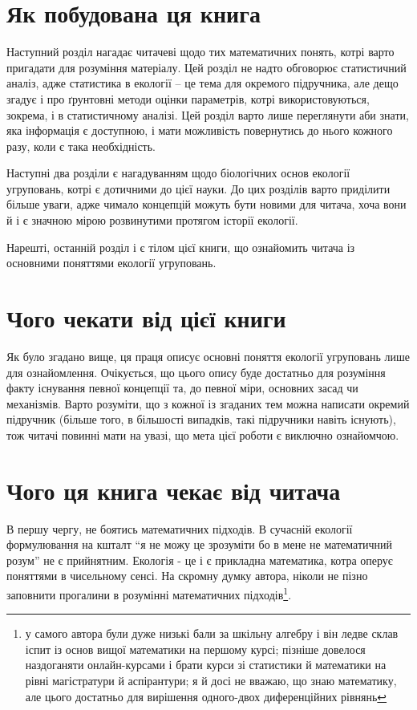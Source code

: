 \documentclass[
  11pt,
]{book}
\begin{document}
\section{Як побудована ця книга}\label{how-built}

Наступний розділ нагадає читачеві щодо тих математичних понять, котрі варто пригадати для розуміння матеріалу. Цей розділ не надто обговорює статистичний аналіз, адже статистика в екології -- це тема для окремого підручника, але дещо згадує і про ґрунтовні методи оцінки параметрів, котрі використовуються, зокрема, і в статистичному аналізі. Цей розділ варто лише переглянути аби знати, яка інформація є доступною, і мати можливість повернутись до нього кожного разу, коли є така необхідність.

Наступні два розділи є нагадуванням щодо біологічних основ екології угруповань, котрі є дотичними до цієї науки. До цих розділів варто приділити більше уваги, адже чимало концепцій можуть бути новими для читача, хоча вони й і є значною мірою розвинутими протягом історії екології.

Нарешті, останній розділ і є тілом цієї книги, що ознайомить читача із основними поняттями екології угруповань.

\section{Чого чекати від цієї книги}\label{expect}

Як було згадано вище, ця праця описує основні поняття екології угруповань лише для ознайомлення. Очікується, що цього опису буде достатньо для розуміння факту існування певної концепції та, до певної міри, основних засад чи механізмів. Варто розуміти, що з кожної із згаданих тем можна написати окремий підручник (більше того, в більшості випадків, такі підручники навіть існують), тож читачі повинні мати на увазі, що мета цієї роботи є виключно ознайомчою.

\section{Чого ця книга чекає від читача}\label{expected}

В першу чергу, не боятись математичних підходів. В сучасній екології формулювання на кшталт ``я не можу це зрозуміти бо в мене не математичний розум'' не є прийнятним. Екологія - це і є прикладна математика, котра оперує поняттями в чисельному сенсі. На скромну думку автора, ніколи не пізно заповнити прогалини в розумінні математичних підходів\footnote{у самого автора були дуже низькі бали за шкільну алгебру і він ледве склав іспит із основ вищої математики на першому курсі; пізніше довелося наздоганяти онлайн-курсами і брати курси зі статистики й математики на рівні магістратури й аспірантури; я й досі не вважаю, що знаю математику, але цього достатньо для вирішення одного-двох диференційних рівнянь}.
\end{document}
